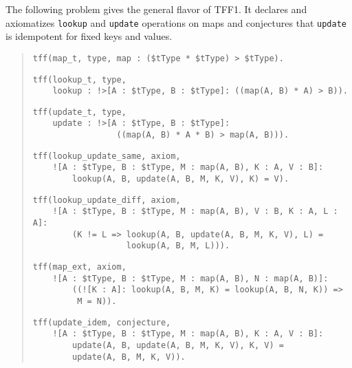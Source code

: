  The following problem gives the general flavor of TFF1.
It declares and axiomatizes {\tt lookup} and {\tt update} operations on
maps and conjectures that {\tt update} is idempotent for fixed keys and
values. %

\begin{quote}
\verb+tff(map_t, type, map : ($tType * $tType) > $tType).+
\par
\verb+tff(lookup_t, type,+\\
\verb+    lookup : !>[A : $tType, B : $tType]: ((map(A, B) * A) > B)).+\kern-10mm
\par
\pagebreak[1] %
\verb+tff(update_t, type,+\\
\verb+    update : !>[A : $tType, B : $tType]:+\\
\verb+                 ((map(A, B) * A * B) > map(A, B))).+
\par%
\pagebreak[2] %
\verb+tff(lookup_update_same, axiom,+\\
\verb+    ![A : $tType, B : $tType, M : map(A, B), K : A, V : B]:+\\
\verb+        lookup(A, B, update(A, B, M, K, V), K) = V).+
\par
\pagebreak[1] %
\verb+tff(lookup_update_diff, axiom,+\\
\verb+    ![A : $tType, B : $tType, M : map(A, B), V : B, K : A, L : A]:+\kern-10mm\\
\verb+        (K != L => lookup(A, B, update(A, B, M, K, V), L) =+\\
\verb+                   lookup(A, B, M, L))).+
\par
\pagebreak[1] %
\verb+tff(map_ext, axiom,+\\
\verb+    ![A : $tType, B : $tType, M : map(A, B), N : map(A, B)]:+\\
\verb+        ((![K : A]: lookup(A, B, M, K) = lookup(A, B, N, K)) =>+\kern-10mm\\
\verb+         M = N)).+
\par%
\pagebreak[2] %
\verb+tff(update_idem, conjecture,+\\
\verb+    ![A : $tType, B : $tType, M : map(A, B), K : A, V : B]:+\\
\verb+        update(A, B, update(A, B, M, K, V), K, V) =+\\
\verb+        update(A, B, M, K, V)).+
\end{quote}
